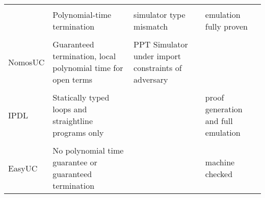 \begin{figure*}
\begin{center}
\begin{tabularx}{\textwidth}{|p{}|p{}|p{}|p{}|}
\hline \\
        & Polynomial-time termination                                  & simulator type mismatch                             & emulation fully proven \\ 
\hline \\
NomosUC & Guaranteed termination, local polynomial time for open terms & PPT Simulator under import constraints of adversary &  \\
\hline \\
IPDL    & Statically typed loops and straightline programs only        & 													 & proof generation and full emulation \\
\hline \\
EasyUC  & No polynomial time guarantee or guaranteed termination       & 													 & machine checked \\ 
\end{tabularx}
\end{center}
\end{figure*}

%
%
%
%

